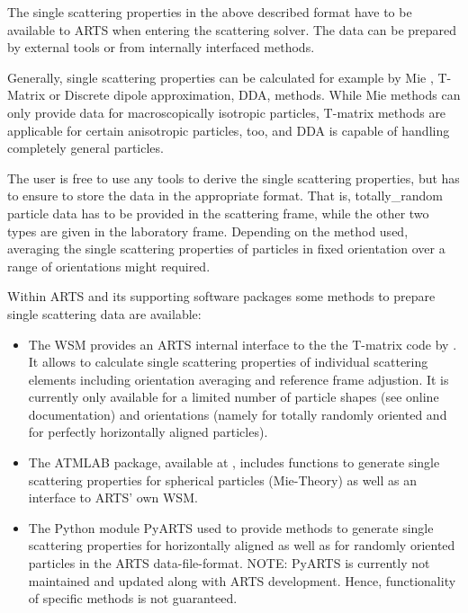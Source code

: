 The single scattering properties in the above described format have to be
available to ARTS when entering the scattering solver. The data can be
prepared by external tools or from internally interfaced methods.

Generally, single scattering properties can be calculated for example by Mie
\citep[e.g.][]{wiscombe80:_improved_ao, maetzler02:_matlab}, T-Matrix
\citep{Mishchenko:98} or Discrete dipole approximation, DDA,
\citep[e.g][]{yurkin11:_adda_jqsrt} methods. While Mie methods can only provide
data for macroscopically isotropic particles, T-matrix methods are applicable
for certain anisotropic particles, too, and DDA is capable of handling
completely general particles.

The user is free to use any tools to derive the single scattering
properties, but has to ensure to store the data in the appropriate format. That
is, totally\_random particle data has to be provided in the
scattering frame, while the other two types are given in the laboratory frame.
Depending on the method used, averaging the single scattering properties of
particles in fixed orientation over a range of orientations might required.

Within ARTS and its supporting software packages some methods to prepare single
scattering data are available:
\begin{itemize}
\item
The WSM  provides an ARTS internal interface
to the the T-matrix code by \citet{Mishchenko:02}. It allows to calculate single
scattering properties of individual scattering elements including orientation
averaging and reference frame adjustion. It is currently only available for a
limited number of particle shapes (see online documentation) and orientations
(namely for totally randomly oriented and for perfectly horizontally aligned
particles).
\item
The ATMLAB package, available at , includes functions to
generate single scattering properties for spherical particles (Mie-Theory) as
well as an interface to ARTS' own  WSM.
\item
The Python module PyARTS used to provide methods to generate single scattering
properties for horizontally aligned as well as for randomly oriented particles
in the ARTS data-file-format. NOTE: PyARTS is currently not maintained and
updated along with ARTS development. Hence, functionality of specific methods is
not guaranteed.
\end{itemize}

